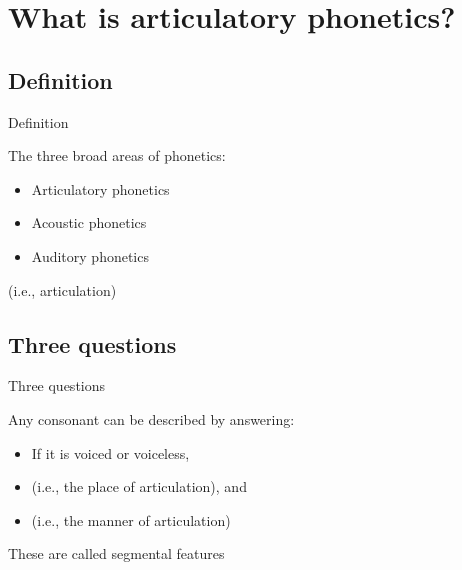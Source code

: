 \documentclass{beamer}
\subtitle[Consonant Articulation]{Articulation of English Consonants}
\newcommand{\suboneone}{Definition}
\newcommand{\subonetwo}{Three questions}
\begin{document}
  

  \section{What is articulatory phonetics?}
    \subsection{\suboneone}
      \begin{frame}{\suboneone}
        \begin{block}{}
          The three broad areas of phonetics:
          \begin{itemize}
            \item \alert{Articulatory phonetics}
            \item Acoustic phonetics
            \item Auditory phonetics
          \end{itemize}
        \end{block}
        \begin{definition}
           (i.e., \alert{articulation})
        \end{definition}
      \end{frame}

    \subsection{\subonetwo}
      \begin{frame}{\subonetwo}
        \begin{block}{}
          Any consonant can be described by answering:
          \begin{itemize}
            \item If it is \alert{voiced} or \alert{voiceless},
            \item  (i.e., the \alert{place of articulation}), and
            \item  (i.e., the \alert{manner of articulation})
          \end{itemize}
        \end{block}
        \begin{alertblock}{}
          These are called \alert{segmental features}
        \end{alertblock}
      \end{frame}
\end{document}
